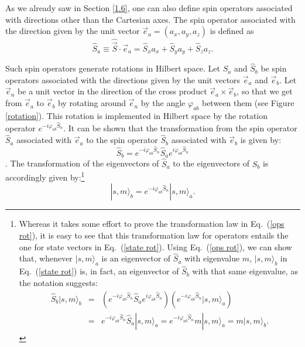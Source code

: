 As we already saw in Section \ref{1.6}, one can also define spin operators associated with directions other than the Cartesian axes. The spin operator associated with the direction given by the unit vector $\vec{e}_a=(a_x,a_y,a_z)$ is defined as
\begin{equation}
\hat{S}_a \equiv \hat{\vec{S}} \cdot \vec{e}_a = \hat{S}_x a_x+\hat{S}_y a_y+\hat{S}_z a_z.
\label{spin op}
\end{equation}

Such spin operators generate rotations in Hilbert space. Let $\hat{S}_a$ and $\hat{S}_b$ be spin operators associated with the directions given by the unit vectors $\vec{e}_a$ and $\vec{e}_b$.  Let $\vec{e}_n$ be a unit vector in the direction of the cross product $\vec{e}_a\times \vec{e}_b$, so that we get from $\vec{e}_a$ to $\vec{e}_b$ by rotating around $\vec{e}_n$ by the angle $\varphi_{ab}$ between them (see Figure \ref{rotation}). This rotation is implemented in Hilbert space by the rotation operator $e^{-i \varphi_{ab} \hat{S}_n}$. It can be shown that the transformation from the spin operator $\hat{S}_a$ associated with $\vec{e}_a$ to the spin operator $\hat{S}_b$ associated with $\vec{e}_b$ is given by:
\begin{equation}
 \hat{S}_b = e^{-i\varphi_{ab} \hat{S}_n}\hat{S}_a e^{i\varphi_{ab}  \hat{S}_n}
\label{ops rot}
\end{equation}
\citep[Vol.\ 2, pp.\ 530--533; see also Baym 1969, pp.\ 305--307]{Messiah 1962}. The transformation of the eigenvectors of $\hat{S}_a$ to the eigenvectors of $\hat{S}_b$ is accordingly given by:\footnote{Whereas it takes some effort to prove the transformation law in Eq.\ (\ref{ops rot}), it is easy to see that this transformation law for operators entails the one for state vectors in Eq.\ (\ref{state rot}). Using Eq.\ (\ref{ops rot}), we can show that, whenever $|s, m\rangle_a$ is an eigenvector of $\hat{S}_a$ with eigenvalue $m$, $|s, m\rangle_b$ in Eq.\ (\ref{state rot}) is, in fact, an eigenvector of $\hat{S}_b$ with that same eigenvalue, as the notation suggests:
\begin{eqnarray*}
\hat{S}_b |s, m\rangle_b & \!\!\! = \!\!\! & \left( e^{-i\varphi_{ab} \hat{S}_n}\hat{S}_a e^{i\varphi_{ab}  \hat{S}_n} \right) \left( e^{-i \varphi_{ab} \hat{S}_n}|s,m\rangle_a\right) \\[.3 cm]
 & \!\!\! = \!\!\! & e^{-i\varphi_{ab} \hat{S}_n}\hat{S}_a |s,m\rangle_a = e^{-i\varphi_{ab} \hat{S}_n} m |s,m\rangle_a = m |s,m\rangle_b.
\end{eqnarray*}}
\begin{equation}
|s,m\rangle_b = e^{-i \varphi_{ab} \hat{S}_n}|s,m\rangle_a.
\label{state rot}
\end{equation}

